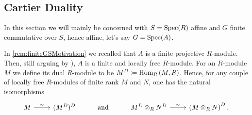 \subsection{Cartier Duality}\label{CartierDualityGroups}
In this section we will mainly be concerned with $S = \operatorname{Spec}(R)$ affine
and $G$ finite commutative over $S$, hence affine, let's say $G = \operatorname{Spec}(A)$.


\begin{rem}[]
	In \cref{rem:finiteGSMotivation} we recalled that $A$ is a finite projective $R$-module.
	Then, still arguing by
	\cite[\href{https://stacks.math.columbia.edu/tag/00NX}{Lemma 00NX}]{SP}),
	$A$ is a finite and locally free $R$-module.
	For an $R$-module $M$ we define its dual $R$-module to be
	$M^D \coloneqq \operatorname{Hom}_{R} \left( M, R \right)$.
	Hence, for any couple of locally free $R$-modules of finite 
	rank $M$ and $N$, one has the natural isomorphisms
	\begin{equation*}%
	\begin{tikzcd}
		M \arrow[r, "\sim", rightarrow] &
		(M^D)^D &
		\text{and} &
		M^D \otimes_R N^D \arrow[r, "\sim", rightarrow] &
		\left( M \otimes_R N \right)^D
	.\end{tikzcd}
	\end{equation*}
\end{rem}


